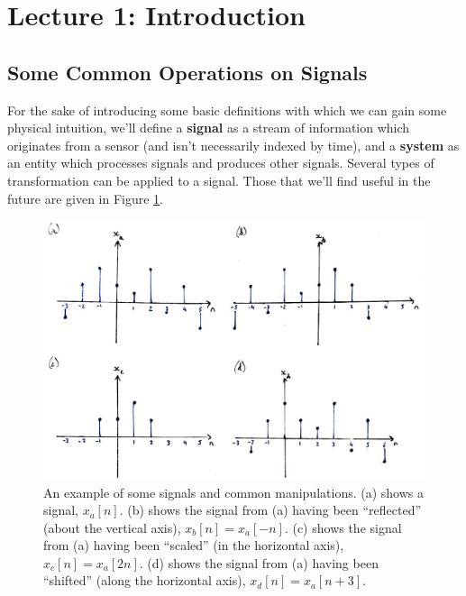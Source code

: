 \section{Lecture 1: Introduction}

\subsection{Some Common Operations on Signals}
%
For the sake of introducing some basic definitions with which we can gain some
physical intuition, we'll define a \textbf{signal} as a stream of information
which originates from a sensor (and isn't necessarily indexed by time), and a
\textbf{system} as an entity which processes signals and produces other signals.
%
Several types of transformation can be applied to a signal. Those that we'll find
useful in the future are given in Figure \ref{fig::lecture_1_signal_operations}.
%
\begin{figure}[H]
  \includegraphics[width=\textwidth]{images/lecture_1_signal_operations.JPG}
  \caption{
    An example of some signals and common manipulations. (a) shows a
    signal, $x_a[n]$. (b) shows the signal from (a) having been ``reflected''
    (about the vertical axis), $x_b[n] = x_a[-n]$. (c) shows the signal from (a)
    having been ``scaled'' (in the horizontal axis), $x_c[n] = x_a[2n]$. (d) shows
    the signal from (a) having been ``shifted'' (along the horizontal axis),
    $x_d[n] = x_a[n+3]$.
  }
  \label{fig::lecture_1_signal_operations}
\end{figure}


